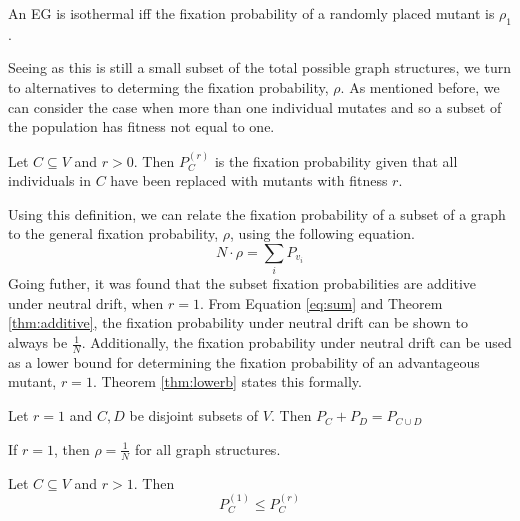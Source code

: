 \documentclass[12pt, AofM.tex]{subfiles}
\begin{document}
\begin{theorem}
    An EG is isothermal iff the fixation probability of a randomly placed mutant is $\rho_1$.
\end{theorem}

Seeing as this is still a small subset of the total possible graph structures, we turn to alternatives to determing the fixation probability, $\rho$. As mentioned before, we can consider the case when more than one individual mutates and so a subset of the population has fitness not equal to one. 
\begin{definition}
    Let $C\subseteq V$ and $r>0$. Then $P_{C}^{(r)}$ is the fixation probability given that all individuals in $C$ have been replaced with mutants with fitness $r$. 
\end{definition}
Using this definition, we can relate the fixation probability of a subset of a graph to the general fixation probability, $\rho$, using the following equation. 
\begin{equation}
    N\cdot \rho = \sum_{i} P_{v_i}
    \label{eq:sum}
\end{equation}
Going futher, it was found that the subset fixation probabilities are additive under neutral drift, when $r=1$. From Equation \ref{eq:sum} and Theorem \ref{thm:additive}, the fixation probability under neutral drift can be shown to always be $\frac{1}{N}$. Additionally, the fixation probability under neutral drift can be used as a lower bound for determining the fixation probability of an advantageous mutant, $r=1$. Theorem \ref{thm:lowerb} states this formally. 
\begin{theorem}
    Let $r=1$ and $C,D$ be disjoint subsets of $V$. Then $P_C + P_D = P_{C\cup D}$\label{thm:additive}
\end{theorem}
\begin{theorem}
    If $r=1$, then $\rho = \frac{1}{N}$ for all graph structures. 
\end{theorem}
\begin{theorem}
    Let $C \subseteq V$ and $r>1$. Then 
    \[P_{C}^{(1)} \leq P_{C}^{(r)}\] \label{thm:lowerb}
\end{theorem}
\end{document}
